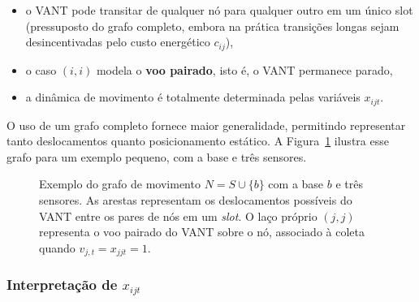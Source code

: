 \documentclass[
    12pt,
    oneside,
    a4paper,
    brazil
]{abntex2}
\begin{document}
    \begin{itemize}
        \item o VANT pode transitar de qualquer nó para qualquer outro em um único slot (pressuposto do grafo completo, embora na prática transições longas sejam desincentivadas pelo custo energético $c_{ij}$),
        \item o caso $(i,i)$ modela o \textbf{voo pairado}, isto é, o VANT permanece parado,
        \item a dinâmica de movimento é totalmente determinada pelas variáveis $x_{ijt}$. 
    \end{itemize}
    
    O uso de um grafo completo fornece maior generalidade, permitindo representar tanto deslocamentos quanto posicionamento estático. A Figura~\ref{fig:grafo-movimento} ilustra esse grafo para um exemplo pequeno, com a base e três sensores.

    \begin{figure}[htbp]
      \centering
      \caption{Exemplo do grafo de movimento $N = S \cup \{b\}$ com a base $b$ e três sensores. As arestas representam os deslocamentos possíveis do VANT entre os pares de nós em um \textit{slot}. O laço próprio $(j,j)$ representa o voo pairado do VANT sobre o nó, associado à coleta quando $v_{j,t} = x_{jjt} = 1$.}
      \label{fig:grafo-movimento}
    \end{figure}

    \subsubsection{Interpretação de $x_{ijt}$}
\end{document}

